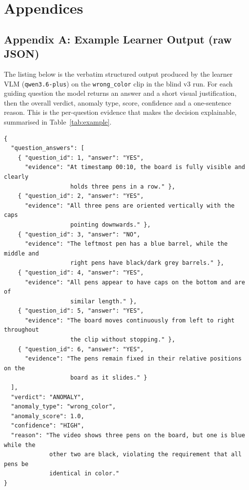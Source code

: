 \chapter*{Appendices}

\section*{Appendix A: Example Learner Output (raw JSON)}
\label{app:json}

The listing below is the verbatim structured output produced by the learner VLM
(\texttt{qwen3.6-plus}) on the \texttt{wrong\_color} clip in the blind v3 run. For each
guiding question the model returns an answer and a short visual justification, then the
overall verdict, anomaly type, score, confidence and a one-sentence reason. This is the
per-question evidence that makes the decision explainable, summarised in
Table~\ref{tab:example}.

\footnotesize
\begin{verbatim}
{
  "question_answers": [
    { "question_id": 1, "answer": "YES",
      "evidence": "At timestamp 00:10, the board is fully visible and clearly
                   holds three pens in a row." },
    { "question_id": 2, "answer": "YES",
      "evidence": "All three pens are oriented vertically with the caps
                   pointing downwards." },
    { "question_id": 3, "answer": "NO",
      "evidence": "The leftmost pen has a blue barrel, while the middle and
                   right pens have black/dark grey barrels." },
    { "question_id": 4, "answer": "YES",
      "evidence": "All pens appear to have caps on the bottom and are of
                   similar length." },
    { "question_id": 5, "answer": "YES",
      "evidence": "The board moves continuously from left to right throughout
                   the clip without stopping." },
    { "question_id": 6, "answer": "YES",
      "evidence": "The pens remain fixed in their relative positions on the
                   board as it slides." }
  ],
  "verdict": "ANOMALY",
  "anomaly_type": "wrong_color",
  "anomaly_score": 1.0,
  "confidence": "HIGH",
  "reason": "The video shows three pens on the board, but one is blue while the
             other two are black, violating the requirement that all pens be
             identical in color."
}
\end{verbatim}
\normalsize
